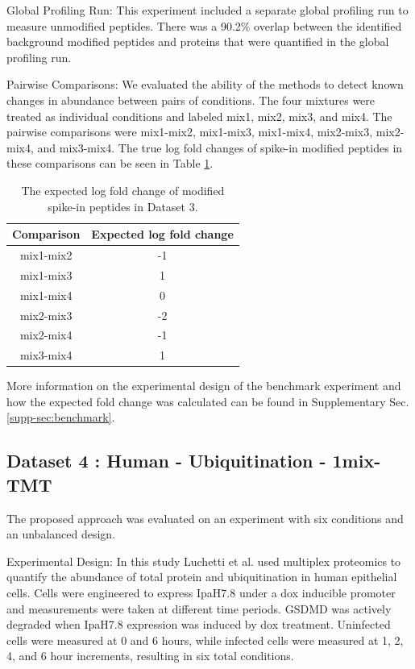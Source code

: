 \documentclass[mcp]{article}
\numberwithin{table}{section}
\begin{document}
Global Profiling Run: This experiment included a separate global profiling run to measure unmodified peptides. There was a 90.2\% overlap between the identified background modified peptides and proteins that were quantified in the global profiling run.

Pairwise Comparisons: We evaluated the ability of the methods to detect known changes in abundance between pairs of conditions. The four mixtures were treated as individual conditions and labeled mix1, mix2, mix3, and mix4. The pairwise comparisons were mix1-mix2, mix1-mix3, mix1-mix4, mix2-mix3, mix2-mix4, and mix3-mix4. The true log fold changes of spike-in modified peptides in these comparisons can be seen in Table \ref{table:spikein_fold_change}.

\begin{table}[h!]
\centering
\begin{tabular}{| c | c |}
\hline
 Comparison & Expected log fold change\\ [0.5ex]
 \hline\hline
 mix1-mix2 & -1\\
 \hline
 mix1-mix3 & 1\\
\hline
 mix1-mix4 & 0\\
\hline
 mix2-mix3 & -2\\
\hline
 mix2-mix4 & -1\\
\hline
 mix3-mix4 & 1\\
\hline
\end{tabular}
\caption{The expected log fold change of modified spike-in peptides in Dataset 3.}
\label{table:spikein_fold_change}
\end{table}

More information on the experimental design of the benchmark experiment and how the expected fold change was calculated can be found in Supplementary Sec. \ref{supp-sec:benchmark}.

\subsection*{Dataset 4 : Human - Ubiquitination - 1mix-TMT}
\label{sec:exp_proc_dataset4}
The proposed approach was evaluated on an experiment with six conditions and an unbalanced design.

Experimental Design: In this study Luchetti et al. \cite{LUCHETTI2021} used multiplex proteomics to quantify the abundance of total protein and ubiquitination in human epithelial cells. Cells were engineered to express IpaH7.8 under a dox inducible promoter and measurements were taken at different time periods. GSDMD was actively degraded when IpaH7.8 expression was induced by dox treatment. Uninfected cells were measured at 0 and 6 hours, while infected cells were measured at 1, 2, 4, and 6 hour increments, resulting in six total conditions.
\end{document}
